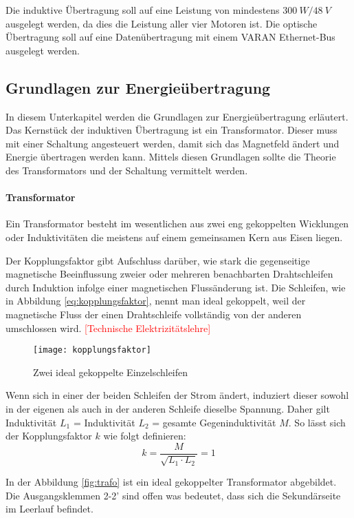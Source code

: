 Die induktive Übertragung soll auf eine Leistung von mindestens $\SI{300}{W}/\SI{48}{V}$ ausgelegt werden, da dies die Leistung aller vier Motoren ist. Die optische Übertragung soll auf eine Datenübertragung mit einem VARAN Ethernet-Bus ausgelegt werden.

\subsection{Grundlagen zur Energieübertragung}
In diesem Unterkapitel werden die Grundlagen zur Energieübertragung erläutert. Das Kernstück der induktiven Übertragung ist ein Transformator. Dieser muss mit einer Schaltung angesteuert werden, damit sich das Magnetfeld ändert und Energie übertragen werden kann. Mittels diesen Grundlagen sollte die Theorie des Transformators und der Schaltung vermittelt werden.

\paragraph{Transformator}
Ein Transformator besteht im wesentlichen aus zwei eng gekoppelten Wicklungen oder Induktivitäten die meistens auf einem gemeinsamen Kern aus Eisen liegen. 

Der Kopplungsfaktor gibt Aufschluss darüber, wie stark die gegenseitige magnetische Beeinflussung zweier oder mehreren benachbarten Drahtschleifen durch Induktion infolge einer magnetischen Flussänderung ist. Die Schleifen, wie in Abbildung \ref{eq:kopplungsfaktor}, nennt man ideal gekoppelt, weil der magnetische Fluss der einen Drahtschleife vollständig von der anderen umschlossen wird. \textcolor{red}{[Technische Elektrizitätslehre]}

\begin{figure}[H]
	\centering
	\texttt{[image: kopplungsfaktor]}
	\caption{Zwei ideal gekoppelte Einzelschleifen}\label{fig:kopplungsfaktor}
\end{figure}

Wenn sich in einer der beiden Schleifen der Strom ändert, induziert dieser sowohl in der eigenen als auch in der anderen Schleife dieselbe Spannung. Daher gilt Induktivität $ L_{1}$ = Induktivität $L_{2}$ = gesamte Gegeninduktivität $M$.
So lässt sich der Kopplungsfaktor $ k $ wie folgt definieren:
\begin{equation}
k=\frac{M}{\sqrt{L_{1}\cdot L_{2}}} = 1
\label{eq:kopplungsfaktor}
\end{equation}

In der Abbildung \ref{fig:trafo} ist ein ideal gekoppelter Transformator abgebildet. Die Ausgangsklemmen 2-2' sind offen was bedeutet, dass sich die Sekundärseite im Leerlauf befindet.
 
